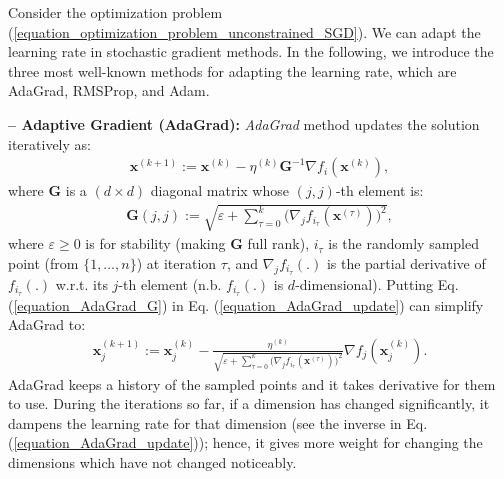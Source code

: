 \documentclass[lang=cn,10pt]{gorgeousnbook}
\numberwithin{equation}{section}%
\numberwithin{figure}{section}%
\begin{document}
Consider the optimization problem (\ref{equation_optimization_problem_unconstrained_SGD}).
We can adapt the learning rate in stochastic gradient methods. In the following, we introduce the three most well-known methods for adapting the learning rate, which are AdaGrad, RMSProp, and Adam.

\hfill\break
\textbf{-- Adaptive Gradient (AdaGrad):}
\textit{AdaGrad} method \cite{duchi2011adaptive} updates the solution iteratively as:
\begin{align}\label{equation_AdaGrad_update}
\boldsymbol{x}^{(k+1)} := \boldsymbol{x}^{(k)} - \eta^{(k)} \boldsymbol{G}^{-1} \nabla f_{i}(\boldsymbol{x}^{(k)}),
\end{align}
where $\boldsymbol{G}$ is a $(d \times d)$ diagonal matrix whose $(j,j)$-th element is:
\begin{align}\label{equation_AdaGrad_G}
\boldsymbol{G}(j,j) := \sqrt{\varepsilon + \sum_{\tau=0}^k \big(\nabla_j f_{i_\tau}(\boldsymbol{x}^{(\tau)})\big)^2},
\end{align}
where $\varepsilon \geq 0$ is for stability (making $\boldsymbol{G}$ full rank), $i_\tau$ is the randomly sampled point (from $\{1, \dots, n\}$) at iteration $\tau$, and $\nabla_j f_{i_\tau}(.)$ is the partial derivative of $f_{i_\tau}(.)$ w.r.t. its $j$-th element (n.b. $f_{i_\tau}(.)$ is $d$-dimensional). 
Putting Eq. (\ref{equation_AdaGrad_G}) in Eq. (\ref{equation_AdaGrad_update}) can simplify AdaGrad to:
\begin{align}\label{equation_AdaGrad_update_2}
\boldsymbol{x}_j^{(k+1)} := \boldsymbol{x}_j^{(k)} - \frac{\eta^{(k)}}{\sqrt{\varepsilon + \sum_{\tau=0}^k \big(\nabla_j f_{i_\tau}(\boldsymbol{x}^{(\tau)})\big)^2}} \nabla f_{j}(\boldsymbol{x}_j^{(k)}).
\end{align}
AdaGrad keeps a history of the sampled points and it takes derivative for them to use. During the iterations so far, if a dimension has changed significantly, it dampens the learning rate for that dimension (see the inverse in Eq. (\ref{equation_AdaGrad_update})); hence, it gives more weight for changing the dimensions which have not changed noticeably. 


\end{document}
